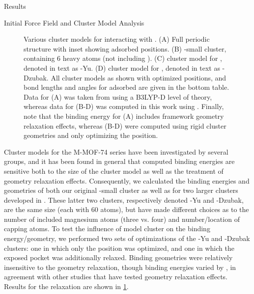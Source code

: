 \begin{section}{Results}
\begin{subsection}{Initial Force Field and Cluster Model Analysis}
\begin{figure}
    \caption[Model clusters for \mgmof]
{ Various cluster models for \mgmof interacting with \co. 
(A) Full periodic \mgmof structure with inset showing adsorbed \co positions. 
(B) \mgmof-small cluster, containing 6 heavy atoms (not including \co). 
(C) \citeauthor{Yu2012c} cluster model for \mgmof, denoted in text as \mgmof-Yu.
(D) \citeauthor{Dzubak2012} cluster model for \mgmof, denoted in text as
\mgmof-Dzubak.
All cluster models as shown with optimized \co positions, and bond lengths and
angles for adsorbed \co are given in the bottom table. Data for (A) was taken
from \citeauthor{Valenzano2010} using a B3LYP-D level of theory,\cite{Valenzano2010}
whereas data for (B-D) was computed in this work using \pbeod. Finally, note
that the binding energy for (A) includes framework geometry relaxation effects,
whereas (B-D) were computed using rigid cluster geometries and only optimizing
the \co position.
            }
    \label{fig:lmoeda-clusters}
    \end{figure}

Cluster models for the M-MOF-74 series have been investigated by several
groups, and it has been found in general that computed binding energies are
sensitive both to the size of the cluster model as well as the treatment of
geometry relaxation effects.\cite{Verma2013,Valenzano2011} Consequently, we
calculated the \co binding energies and geometries of both our original
\mgmof-small cluster as well as for two larger clusters developed in
. These latter two clusters, respectively denoted
\mgmof-Yu and \mgmof-Dzubak, are the same size (each with 60 atoms), but have
made different choices as to the number of included magnesium atoms (three vs.
four) and number/location of capping atoms. To test the influence of model
cluster on the \co binding energy/geometry, we performed two sets of
optimizations of the \mgmof-Yu and \mgmof-Dzubak clusters: one in which only
the \co position was optimized, and one in which the exposed  pocket
was additionally relaxed. Binding geometries were relatively insensitive to
the geometry relaxation, though binding energies varied by , in
agreement with other studies that have tested geometry
relaxation effects.\cite{Verma2013} Results for the  relaxation are shown in
\cref{fig:lmoeda-clusters}. 


\end{subsection}
\end{section}
